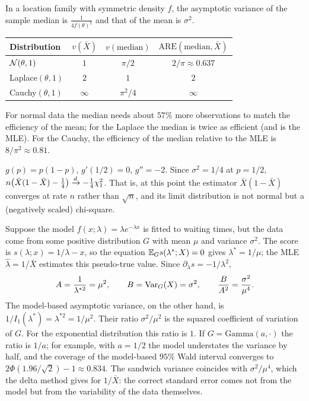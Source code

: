 \documentclass[main.tex]{subfiles}
\begin{document}
\begin{example}\label{ex:are}
In a location family with symmetric density $f$, the asymptotic variance of the sample median is $\frac{1}{4f(\theta)^2}$ and that of the mean is $\sigma^2$.
\begin{center}
\begin{tabular}{@{}lccc@{}}
\toprule
Distribution & $v(\bar X)$ & $v(\text{median})$ & $\mathrm{ARE}(\text{median},\bar X)$ \\
\midrule
$\mathcal{N}(\theta,1)$ & $1$ & $\pi/2$ & $2/\pi\approx0.637$ \\
Laplace$(\theta,1)$ & $2$ & $1$ & $2$ \\
Cauchy$(\theta,1)$ & $\infty$ & $\pi^2/4$ & $\infty$ \\
\bottomrule
\end{tabular}
\end{center}
For normal data the median needs about $57\%$ more observations to match the efficiency of the mean; for the Laplace the median is twice as efficient (and is the MLE). For the Cauchy, the efficiency of the median relative to the MLE is $8/\pi^2\approx0.81$.
\end{example}

\begin{example}[Second-Order Delta: $p(1-p)$ at $p=1/2$]
$g(p)=p(1-p)$, $g'(1/2)=0$, $g''=-2$. Since $\sigma^2=1/4$ at $p=1/2$,
$n\big(\bar X(1-\bar X)-\tfrac14\big)\xrightarrow{d}-\tfrac14\chi^2_1$. That is, at this point the estimator $\bar X(1-\bar X)$ converges at rate $n$ rather than $\sqrt n$, and its limit distribution is not normal but a (negatively scaled) chi-square.
\end{example}

\begin{example}\label{ex:ustel-yanlis}
Suppose the model $f(x;\lambda)=\lambda e^{-\lambda x}$ is fitted to waiting times, but the data come from some positive distribution $G$ with mean $\mu$ and variance $\sigma^2$. The score is $s(\lambda;x)=1/\lambda-x$, so the equation $\mathbb{E}_Gs(\lambda^*;X)=0$ gives $\lambda^*=1/\mu$; the MLE $\hat\lambda=1/\bar X$ estimates this pseudo-true value. Since $\partial_\lambda s=-1/\lambda^2$,
\[
A=\frac1{\lambda^{*2}}=\mu^2,\qquad B=\operatorname{Var}_G(X)=\sigma^2,\qquad\frac{B}{A^2}=\frac{\sigma^2}{\mu^4}.
\]
The model-based asymptotic variance, on the other hand, is $1/I_1(\lambda^*)=\lambda^{*2}=1/\mu^2$. Their ratio $\sigma^2/\mu^2$ is the squared coefficient of variation of $G$. For the exponential distribution this ratio is $1$. If $G=\text{Gamma}(a,\cdot)$ the ratio is $1/a$; for example, with $a=1/2$ the model understates the variance by half, and the coverage of the model-based $95\%$ Wald interval converges to $2\Phi(1.96/\sqrt2)-1\approx0.834$. The sandwich variance coincides with $\sigma^2/\mu^4$, which the delta method gives for $1/\bar X$: the correct standard error comes not from the model but from the variability of the data themselves.
\end{example}
\end{document}
